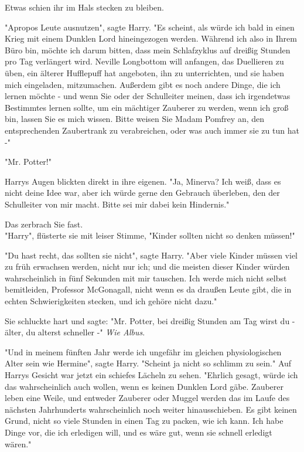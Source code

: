 {Etwas schien ihr im Hals stecken zu bleiben.

"Apropos Leute ausnutzen", sagte Harry. "Es scheint, als würde ich bald in einen Krieg mit einem Dunklen Lord hineingezogen werden. Während ich also in Ihrem Büro bin, möchte ich darum bitten, dass mein Schlafzyklus auf dreißig Stunden pro Tag verlängert wird. Neville Longbottom will anfangen, das Duellieren zu üben, ein älterer Hufflepuff hat angeboten, ihn zu unterrichten, und sie haben mich eingeladen, mitzumachen. Außerdem gibt es noch andere Dinge, die ich lernen möchte - und wenn Sie oder der Schulleiter meinen, dass ich irgendetwas Bestimmtes lernen sollte, um ein mächtiger Zauberer zu werden, wenn ich groß bin, lassen Sie es mich wissen. Bitte weisen Sie Madam Pomfrey an, den entsprechenden Zaubertrank zu verabreichen, oder was auch immer sie zu tun hat -"

"Mr. Potter!"

Harrys Augen blickten direkt in ihre eigenen. "Ja, Minerva? Ich weiß, dass es nicht deine Idee war, aber ich würde gerne den Gebrauch überleben, den der Schulleiter von mir macht. Bitte sei mir dabei kein Hindernis."

Das zerbrach Sie fast.\\ "Harry", flüsterte sie mit leiser Stimme, "Kinder sollten nicht so denken müssen!"

"Du hast recht, das sollten sie nicht", sagte Harry. "Aber viele Kinder müssen viel zu früh erwachsen werden, nicht nur ich; und die meisten dieser Kinder würden wahrscheinlich in fünf Sekunden mit mir tauschen. Ich werde mich nicht selbst bemitleiden, Professor McGonagall, nicht wenn es da draußen Leute gibt, die in echten Schwierigkeiten stecken, und ich gehöre nicht dazu."

Sie schluckte hart und sagte: "Mr. Potter, bei dreißig Stunden am Tag wirst du - älter, du alterst schneller -" \emph{Wie Albus}.

"Und in meinem fünften Jahr werde ich ungefähr im gleichen physiologischen Alter sein wie Hermine", sagte Harry. "Scheint ja nicht so schlimm zu sein." Auf Harrys Gesicht war jetzt ein schiefes Lächeln zu sehen. "Ehrlich gesagt, würde ich das wahrscheinlich auch wollen, wenn es keinen Dunklen Lord gäbe. Zauberer leben eine Weile, und entweder Zauberer oder Muggel werden das im Laufe des nächsten Jahrhunderts wahrscheinlich noch weiter hinausschieben. Es gibt keinen Grund, nicht so viele Stunden in einen Tag zu packen, wie ich kann. Ich habe Dinge vor, die ich erledigen will, und es wäre gut, wenn sie schnell erledigt wären."

}
